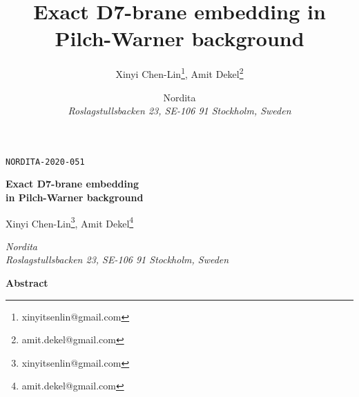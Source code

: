 \documentclass[12pt]{article}
\title{\textbf{Exact D7-brane embedding in Pilch-Warner background}}
\author{Xinyi Chen-Lin\footnote{xinyitsenlin@gmail.com}, Amit Dekel\footnote{amit.dekel@gmail.com}}
\date{%
Nordita\\
\textit{Roslagstullsbacken 23, SE-106 91 Stockholm, Sweden}
}
\begin{document}
\begin{flushright}\footnotesize
\texttt{NORDITA-2020-051} \\
\vspace{0.6cm}
\end{flushright}


\begin{center}
{\Large\textbf{ Exact D7-brane embedding\\ in Pilch-Warner background}
\par}

\vspace{0.8cm}

\textrm{Xinyi Chen-Lin\footnote{xinyitsenlin@gmail.com}, Amit Dekel\footnote{amit.dekel@gmail.com}}
\vspace{4mm}

\textit{Nordita\\
Roslagstullsbacken 23, SE-106 91 Stockholm, Sweden}


\vspace{5mm}

\textbf{Abstract} 
\vspace{5mm}

\begin{minipage}{13cm}

\end{minipage}

\end{center}

\newpage

\tableofcontents















\end{document}
